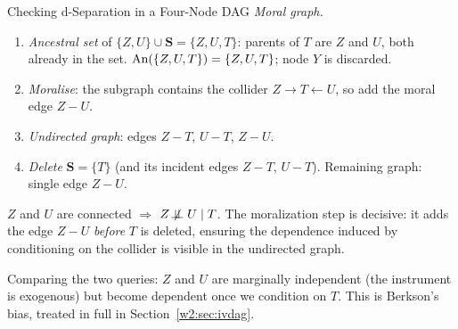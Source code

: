 \documentclass[master.tex]{subfiles}
\begin{document}
\begin{example}{Checking d-Separation in a Four-Node DAG}
\medskip
\noindent\emph{Moral graph.}
\begin{enumerate}
  \item \emph{Ancestral set} of $\{Z, U\} \cup \mathbf{S} = \{Z, U, T\}$:
        parents of $T$ are $Z$ and $U$, both already in the set.
        $\mathrm{An}(\{Z,U,T\}) = \{Z, U, T\}$; node $Y$ is discarded.
  \item \emph{Moralise}: the subgraph contains the collider $Z \to T
        \leftarrow U$, so add the moral edge $Z - U$.
  \item \emph{Undirected graph}: edges $Z - T$, $U - T$, $Z - U$.
  \item \emph{Delete} $\mathbf{S} = \{T\}$ (and its incident edges $Z-T$, $U-T$).
        Remaining graph: single edge $Z - U$.
\end{enumerate}
$Z$ and $U$ are connected $\Rightarrow$ $Z \not\!\perp\!\!\!\perp U \mid T$.
The moralization step is decisive: it adds the edge $Z - U$ \emph{before}
$T$ is deleted, ensuring the dependence induced by conditioning on the
collider is visible in the undirected graph.

\medskip
Comparing the two queries: $Z$ and $U$ are marginally independent (the
instrument is exogenous) but become dependent once we condition on $T$.
This is Berkson's bias, treated in full in Section~\ref{w2:sec:ivdag}.
\end{example}
\end{document}
